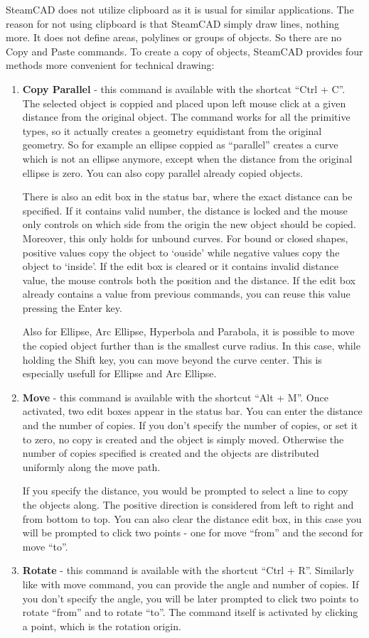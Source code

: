 SteamCAD does not utilize clipboard as it is usual for similar applications. The
reason for not using clipboard is that SteamCAD simply draw lines, nothing more. It
does not define areas, polylines or groups of objects. So there are no Copy and Paste
commands. To create a copy of objects, SteamCAD provides four methods more convenient
for technical drawing:
\begin{enumerate}
\item \textbf{Copy Parallel}\label{sec:copypar} - this command is available with the shortcat ``Ctrl + C''.
The selected object is coppied and placed upon left mouse click at a given distance
from the original object. The command works for all the primitive types, so it actually
creates a geometry equidistant from the original geometry. So for example an ellipse
coppied as ``parallel'' creates a curve which is not an ellipse anymore, except when
the distance from the original ellipse is zero. You can also copy parallel already copied
objects.

There is also an edit box in the status bar, where the exact distance can be specified.
If it contains valid number, the distance is locked and the mouse only controls on which
side from the origin the new object should be copied. Moreover, this only holds for
unbound curves. For bound or closed shapes, positive values copy the object to `ouside'
while negative values copy the object to `inside'. If the edit box is cleared or it
contains invalid distance value, the mouse controls both the position and the distance.
If the edit box already contains a value from previous commands, you can reuse this value
pressing the Enter key.

Also for Ellipse, Arc Ellipse, Hyperbola and Parabola, it is possible to move the copied
object further than is the smallest curve radius. In this case, while holding the Shift
key, you can move beyond the curve center. This is especially usefull for Ellipse and
Arc Ellipse.
\item \textbf{Move} - this command is available with the shortcut ``Alt + M''. Once activated,
two edit boxes appear in the status bar. You can enter the distance and the number of copies.
If you don't specify the number of copies, or set it to zero, no copy is created and
the object is simply moved. Otherwise the number of copies specified is created and
the objects are distributed uniformly along the move path.

If you specify the distance, you would be prompted to select a line to copy the
objects along. The positive direction is considered from left to right and from bottom
to top. You can also clear the distance edit box, in this case you will be prompted
to click two points - one for move ``from'' and the second for move ``to''.
\item \textbf{Rotate} - this command is available with the shortcut ``Ctrl + R''.
Similarly like with move command, you can provide the angle and number of copies.
If you don't specify the angle, you will be later prompted to click two points to
rotate ``from'' and to rotate ``to''. The command itself is activated by clicking
a point, which is the rotation origin.


\end{enumerate}
